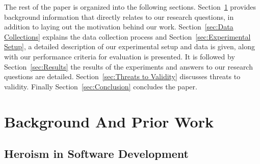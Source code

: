\documentclass[sigconf,review]{acmart}
\begin{document}
The rest of the paper is organized into the following sections. Section~\ref{sec:Background And Prior Work} provides background information that directly relates to our research questions, in addition to laying out the motivation behind our work. Section~\ref{sec:Data Collections} explains the data collection process and  Section~\ref{sec:Experimental Setup}, a detailed description of our experimental setup and data is given, along with our performance criteria for evaluation is presented. It is followed by Section~\ref{sec:Results} the results of the experiments and answers to our research questions are detailed. Section~\ref{sec:Threats to Validity} discusses threats to validity. Finally Section~\ref{sec:Conclusion} concludes the paper.



\section{Background And Prior Work }
\label{sec:Background And Prior Work}

\subsection{Heroism in Software Development}
\end{document}
